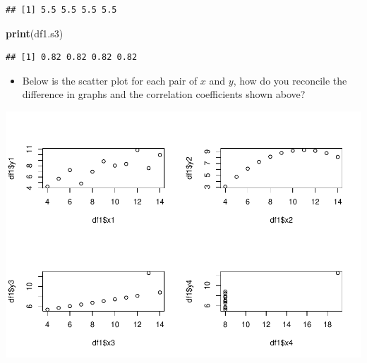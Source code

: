 \documentclass[
]{book}
\newenvironment{Shaded}{\begin{snugshade}}{\end{snugshade}}
\newcommand{\DataTypeTok}[1]{\textcolor[rgb]{0.13,0.29,0.53}{#1}}
\newcommand{\DecValTok}[1]{\textcolor[rgb]{0.00,0.00,0.81}{#1}}
\newcommand{\KeywordTok}[1]{\textcolor[rgb]{0.13,0.29,0.53}{\textbf{#1}}}
\newcommand{\NormalTok}[1]{#1}
\newcommand{\OperatorTok}[1]{\textcolor[rgb]{0.81,0.36,0.00}{\textbf{#1}}}
\providecommand{\tightlist}{%
  \setlength{\itemsep}{0pt}\setlength{\parskip}{0pt}}
\begin{document}
\begin{verbatim}
## [1] 5.5 5.5 5.5 5.5
\end{verbatim}

\begin{Shaded}
\begin{Highlighting}[]
\KeywordTok{print}\NormalTok{(df1.s3)}
\end{Highlighting}
\end{Shaded}

\begin{verbatim}
## [1] 0.82 0.82 0.82 0.82
\end{verbatim}

\begin{itemize}
\tightlist
\item
  Below is the scatter plot for each pair of \(x\) and \(y\), how do you reconcile the difference in graphs and the correlation coefficients shown above?
\end{itemize}

\begin{Shaded}
\end{Shaded}

\includegraphics{Metrics_files/figure-latex/unnamed-chunk-19-1.pdf}
\end{document}
